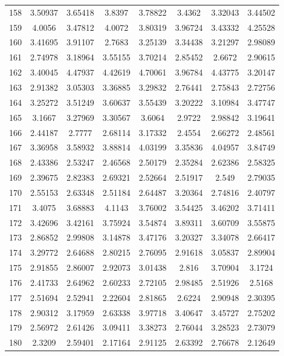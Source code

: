 \begin{figure}
\begin{tabular}{cccccccc}
158 & 3.50937 & 3.65418 & 3.8397 & 3.78822 & 3.4362 & 3.32043 & 3.44502\\
159 & 4.0056 & 3.47812 & 4.0072 & 3.80319 & 3.96724 & 3.43332 & 4.25528\\
160 & 3.41695 & 3.91107 & 2.7683 & 3.25139 & 3.34438 & 3.21297 & 2.98089\\
161 & 2.74978 & 3.18964 & 3.55155 & 3.70214 & 2.85452 & 2.6672 & 2.90615\\
162 & 3.40045 & 4.47937 & 4.42619 & 4.70061 & 3.96784 & 4.43775 & 3.20147\\
163 & 2.91382 & 3.05303 & 3.36885 & 3.29832 & 2.76441 & 2.75843 & 2.72756\\
164 & 3.25272 & 3.51249 & 3.60637 & 3.55439 & 3.20222 & 3.10984 & 3.47747\\
165 & 3.1667 & 3.27969 & 3.30567 & 3.6064 & 2.9722 & 2.98842 & 3.19641\\
166 & 2.44187 & 2.7777 & 2.68114 & 3.17332 & 2.4554 & 2.66272 & 2.48561\\
167 & 3.36958 & 3.58932 & 3.88814 & 4.03199 & 3.35836 & 4.04957 & 3.84749\\
168 & 2.43386 & 2.53247 & 2.46568 & 2.50179 & 2.35284 & 2.62386 & 2.58325\\
169 & 2.39675 & 2.82383 & 2.69321 & 2.52664 & 2.51917 & 2.549 & 2.79035\\
170 & 2.55153 & 2.63348 & 2.51184 & 2.64487 & 3.20364 & 2.74816 & 2.40797\\
171 & 3.4075 & 3.68883 & 4.1143 & 3.76002 & 3.54425 & 3.46202 & 3.71411\\
172 & 3.42696 & 3.42161 & 3.75924 & 3.54874 & 3.89311 & 3.60709 & 3.55875\\
173 & 2.86852 & 2.99808 & 3.14878 & 3.47176 & 3.20327 & 3.34078 & 2.66417\\
174 & 3.29772 & 2.64688 & 2.80215 & 2.76095 & 2.91618 & 3.05837 & 2.89904\\
175 & 2.91855 & 2.86007 & 2.92073 & 3.01438 & 2.816 & 3.70904 & 3.1724\\
176 & 2.41733 & 2.64962 & 2.60233 & 2.72105 & 2.98485 & 2.51926 & 2.5168\\
177 & 2.51694 & 2.52941 & 2.22604 & 2.81865 & 2.6224 & 2.90948 & 2.30395\\
178 & 2.90312 & 3.17959 & 2.63338 & 3.97718 & 3.40647 & 3.45727 & 2.75202\\
179 & 2.56972 & 2.61426 & 3.09411 & 3.38273 & 2.76044 & 3.28523 & 2.73079\\
180 & 2.3209 & 2.59401 & 2.17164 & 2.91125 & 2.63392 & 2.76678 & 2.12649\\

\end{tabular}
\end{figure}
